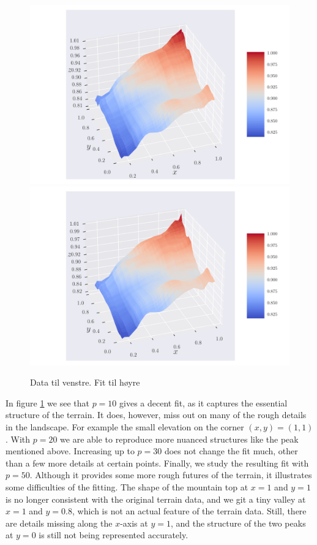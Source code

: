 \documentclass[reprint,english,notitlepage,aps,nobalancelastpage,nofootinbib]{revtex4-1}  %
\begin{document}
\begin{figure}[h]
	\includegraphics[width=\linewidth]{SRTM_prediction_p30.pdf}
	\endminipage\hfill
	\includegraphics[width=\linewidth]{SRTM_prediction_p50.pdf}
	\endminipage
	\caption{Data til venstre. Fit til høyre}
  \label{fig:terrain_fit}
\end{figure}

In figure \ref{fig:terrain_fit} we see that $p=10$ gives a decent fit, as it captures the essential structure of the terrain. It does, however, miss out on many of the rough details in the landscape. For example the small elevation on the corner $(x,y) = (1,1)$. With $p=20$ we are able to reproduce more nuanced structures like the peak mentioned above. Increasing up to $p=30$ does not change the fit much, other than a few more details at certain points. Finally, we study the resulting fit with $p=50$. Although it provides some more rough futures of the terrain, it illustrates some difficulties of the fitting. The shape of the mountain top at $x=1$ and $y=1$ is no longer consistent with the original terrain data, and we git a tiny valley at $x=1$ and $y=0.8$, which is not an actual feature of the terrain data. Still, there are details missing along the $x$-axis at $y=1$, and the structure of the two peaks at $y=0$ is still not being represented accurately.
\end{document}
